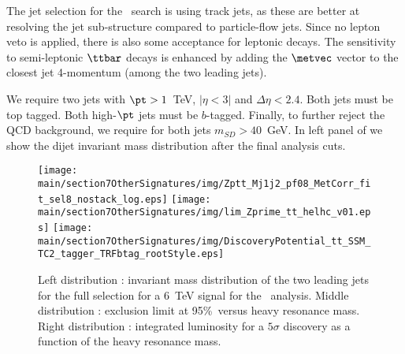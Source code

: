 
The jet selection for the \zptt\ search is using track jets, as these are better at resolving the jet sub-structure compared to particle-flow jets. Since no lepton veto is applied, there is also some acceptance for leptonic decays. The sensitivity to semi-leptonic $\ttbar$ decays is enhanced by adding the $\metvec$ vector to the closest jet 4-momentum (among the two leading jets).

We require two jets with $\pt>1$~TeV, $|\eta<3|$ and $\Delta\eta<2.4$. Both jets must be top tagged. Both high-$\pt$ jets must be $b$-tagged. Finally, to further reject the QCD background, we require for both jets $m_{SD}>40$~GeV.  In left panel of  we show the dijet invariant mass distribution after the final analysis cuts. 
\begin{figure}[tbp]
  \centering
  \texttt{[image: \\main/section7OtherSignatures/img/Zptt\_Mj1j2\_pf08\_MetCorr\_fit\_sel8\_nostack\_log.eps]}
  \texttt{[image: \\main/section7OtherSignatures/img/lim\_Zprime\_tt\_helhc\_v01.eps]}
  \texttt{[image: \\main/section7OtherSignatures/img/DiscoveryPotential\_tt\_SSM\_TC2\_tagger\_TRFbtag\_rootStyle.eps]}
  \caption{Left distribution : invariant mass distribution of the two leading jets for the full selection for a 6~TeV signal for the \zptt\ analysis. Middle distribution : exclusion limit at 95\%~\cl versus heavy resonance mass. Right distribution : integrated luminosity for a $5\sigma$ discovery as a function of the heavy resonance mass.}
  \label{fig:hadronicresonances:ttsel08}
\end{figure}

